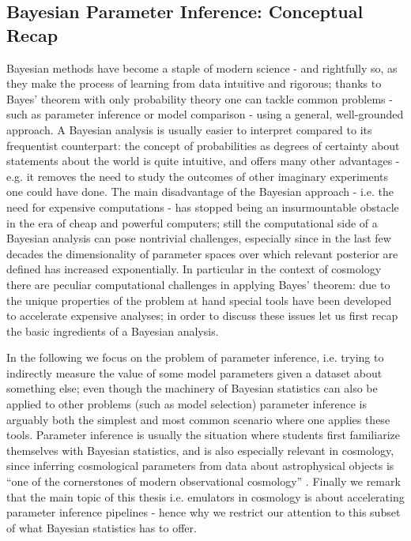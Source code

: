 \subsection{Bayesian Parameter Inference: Conceptual Recap}
Bayesian methods have become a staple of modern science - and rightfully so, as they make the process of learning from data intuitive and rigorous; thanks to Bayes' theorem with only probability theory one can tackle common problems - such as parameter inference or model comparison - using a general, well-grounded approach. A Bayesian analysis is usually easier to interpret compared to its frequentist counterpart: the concept of probabilities as degrees of certainty about statements about the world is quite intuitive, and offers many other advantages - e.g. it removes the need to study the outcomes of other imaginary experiments one could have done. The main disadvantage of the Bayesian approach - i.e. the need for expensive computations - has stopped being an insurmountable obstacle in the era of cheap and powerful computers; still the computational side of a Bayesian analysis can pose nontrivial challenges, especially since in the last few decades the dimensionality of parameter spaces over which relevant posterior are defined has increased exponentially.
In particular in the context of cosmology there are peculiar computational challenges in applying Bayes' theorem: due to the unique properties of the problem at hand special tools have been developed to accelerate expensive analyses; in order to discuss these issues let us first recap the basic ingredients of a Bayesian analysis.

In the following we focus on the problem of parameter inference, i.e. trying to indirectly measure the value of some model parameters given a dataset about something else; even though the machinery of Bayesian statistics can also be applied to other problems (such as model selection) parameter inference is arguably both the simplest and most common scenario where one applies these tools. Parameter inference is usually the situation where students first familiarize themselves with Bayesian statistics, and is also especially relevant in cosmology, since inferring cosmological parameters from data about astrophysical objects is ``one of the cornerstones of modern observational cosmology'' \cite{cosmopower}. Finally we remark that the main topic of this thesis i.e. emulators in cosmology is about accelerating parameter inference pipelines - hence why we restrict our attention to this subset of what Bayesian statistics has to offer.

